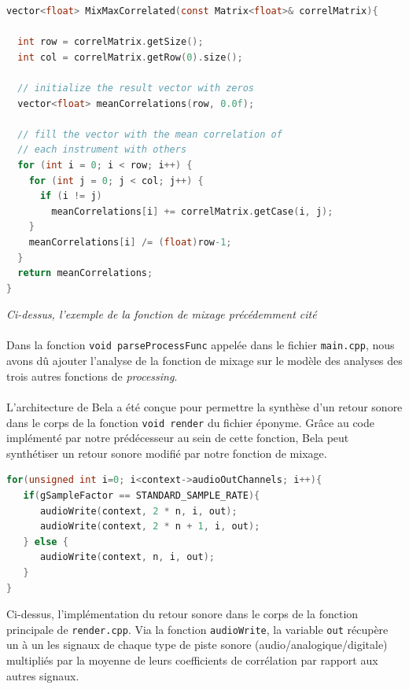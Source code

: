 \begin{lstlisting}[language=C, frame=single, breaklines=true]
vector<float> MixMaxCorrelated(const Matrix<float>& correlMatrix){

  int row = correlMatrix.getSize();
  int col = correlMatrix.getRow(0).size();

  // initialize the result vector with zeros
  vector<float> meanCorrelations(row, 0.0f);

  // fill the vector with the mean correlation of
  // each instrument with others
  for (int i = 0; i < row; i++) {
    for (int j = 0; j < col; j++) {
      if (i != j)
        meanCorrelations[i] += correlMatrix.getCase(i, j);
    }
    meanCorrelations[i] /= (float)row-1;
  }
  return meanCorrelations;
}
\end{lstlisting}

\begin{center}
 \textit{Ci-dessus, l'exemple de la fonction de mixage précédemment cité}
\end{center}

\paragraph{}
Dans la fonction \verb!void parseProcessFunc!  appelée dans le fichier
\verb!main.cpp!, nous avons dû ajouter l'analyse de la fonction de
mixage sur le modèle des analyses des trois autres fonctions de
\textit{processing}.

\paragraph{}
L'architecture de Bela a été conçue pour permettre la synthèse d'un
retour sonore dans le corps de la fonction \verb!void render! du
fichier éponyme. Grâce au code implémenté par notre prédécesseur au
sein de cette fonction, Bela peut synthétiser un retour sonore modifié
par notre fonction de mixage.

\begin{lstlisting}[language=C, frame=single, breaklines=true]
for(unsigned int i=0; i<context->audioOutChannels; i++){
   if(gSampleFactor == STANDARD_SAMPLE_RATE){
      audioWrite(context, 2 * n, i, out);
      audioWrite(context, 2 * n + 1, i, out);
   } else {
      audioWrite(context, n, i, out);
   }
}
\end{lstlisting}

\begin{center} Ci-dessus, l'implémentation du retour sonore
  dans le corps de la fonction principale de \verb!render.cpp!. Via la
  fonction \verb!audioWrite!, la variable \verb!out! récupère un à un
  les signaux de chaque type de piste sonore
  (audio/analogique/digitale) multipliés par la moyenne de leurs
  coefficients de corrélation par rapport aux autres
  signaux. \end{center}

